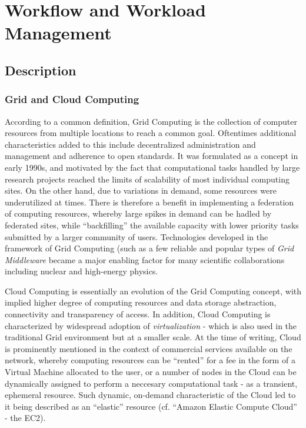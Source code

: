 \section{Workflow and Workload Management}

\subsection{Description}
\subsubsection{Grid and Cloud Computing}
According to a common definition, Grid Computing is the collection of computer resources from multiple locations to reach a common goal. Oftentimes additional characteristics added to this include decentralized
administration and management and adherence to open standards. It was formulated as a concept in early 1990s, and motivated by the fact that computational tasks handled by large research projects reached
the limits of scalability of most individual computing sites. On the other hand, due to variations in demand, some resources were underutilized at times. There is therefore a benefit in implementing a federation of
computing resources, whereby large spikes in demand can be hadled by federated sites, while ``backfilling'' the available capacity with lower priority tasks submitted by a larger community of users.
Technologies developed in the framework of Grid Computing (such as a few reliable and popular types of \textit{Grid Middleware} became a major enabling factor for many scientific collaborations including
nuclear and high-energy physics.

Cloud Computing is essentially an evolution of the Grid Computing concept, with implied higher degree of computing resources and data storage abstraction, connectivity and transparency of access.
In addition, Cloud Computing is characterized by widespread adoption of \textit{virtualization} - which is also used in the traditional Grid environment but at a smaller scale.
At the time of writing, Cloud is prominently mentioned in the context of commercial services available on the network, whereby computing resources can be ``rented'' for a fee in the form of a Virtual Machine allocated
to the user, or a  number of nodes in the Cloud can be dynamically assigned to perform a neccesary computational task - as a transient, ephemeral resource. Such dynamic, on-demand characteristic
of the Cloud led to it being described as an ``elastic'' resource (cf. ``Amazon Elastic Compute Cloud'' - the EC2).

